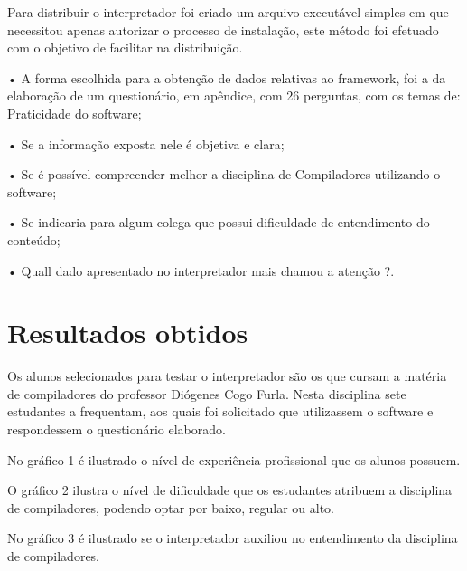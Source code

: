\documentclass[12pt,oneside,a4paper,chapter=TITLE,section=TITLE,sumario=tradicional]{abntex2}
\begin{document}
Para distribuir o interpretador foi criado um arquivo executável simples em que necessitou apenas autorizar o processo de instalação, este método foi efetuado com o objetivo de facilitar na distribuição.

•	A forma escolhida para a obtenção de dados relativas ao framework, foi a da elaboração de um questionário, em apêndice, com 26 perguntas, com os temas de:
Praticidade do software;

•	Se a informação exposta nele é objetiva e clara;

•	Se é possível compreender melhor a disciplina de Compiladores utilizando o software;

•	Se indicaria para algum colega que possui dificuldade de entendimento do conteúdo;

•	Quall dado apresentado no interpretador mais chamou a atenção ?.

\section{Resultados obtidos}
\label{sec:resultados}

Os alunos selecionados para testar o interpretador são os que cursam a matéria de compiladores do professor Diógenes Cogo Furla. Nesta disciplina sete estudantes a frequentam, aos quais foi solicitado que utilizassem o software e respondessem o questionário elaborado.

No gráfico 1 é ilustrado o nível de experiência profissional que os alunos possuem.

\begin{grafico}[H]
\end{grafico}

O gráfico 2 ilustra o nível de dificuldade que os estudantes atribuem a disciplina de compiladores, podendo optar por baixo, regular ou alto.

\begin{grafico}[H]
\end{grafico}

No gráfico 3 é ilustrado se o interpretador auxiliou no entendimento da disciplina de compiladores.

\begin{grafico}[H]
\end{grafico}
\end{document}
